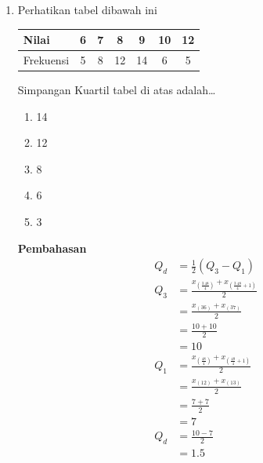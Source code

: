 \documentclass{report}
\newcommand{\options}[5]{
\begin{enumerate}[label=\alph*.]
	\item #1
	\item #2
	\item #3
	\item #4
	\item #5
\end{enumerate}
}
\newcommand{\pemb}{ \textbf{Pembahasan} \\}
\begin{document}
\begin{enumerate}
\item Perhatikan tabel dibawah ini\\
\begin{center}
\begin{tabular}{|l|c|c|c|c|c|c|}
	\hline
	Nilai & 6 & 7 & 8 & 9 & 10 & 12 \\
	\hline
	Frekuensi & 5 & 8 & 12 & 14 & 6 & 5 \\
	\hline
\end{tabular}
\end{center}
Simpangan Kuartil tabel di atas adalah\ldots
\options
{14}
{12}
{8}
{6}
{3}
\pemb
\begin{align*}
	Q_{d}&=\frac{1}{2}(Q_3-Q_1) \\
	Q_{3}
	&=\frac{x_{\left(\frac{3.48}{4}\right)}+x_{\left(\frac{3.48}{4}+1\right)}}{2}\\
	&=\frac{x_{(36)}+x_{(37)}}{2}\\
	&=\frac{10+10}{2}\\
	&=10\\
	Q_{1}
	&=\frac{x_{\left(\frac{48}{4}\right)}+x_{\left(\frac{48}{4}+1\right)}}{2}\\
	&=\frac{x_{(12)}+x_{(13)}}{2}\\
	&=\frac{7+7}{2}\\
	&=7\\
	Q_d&=\frac{10-7}{2}\\&=1.5
\end{align*}

	


\end{enumerate}
\end{document}

